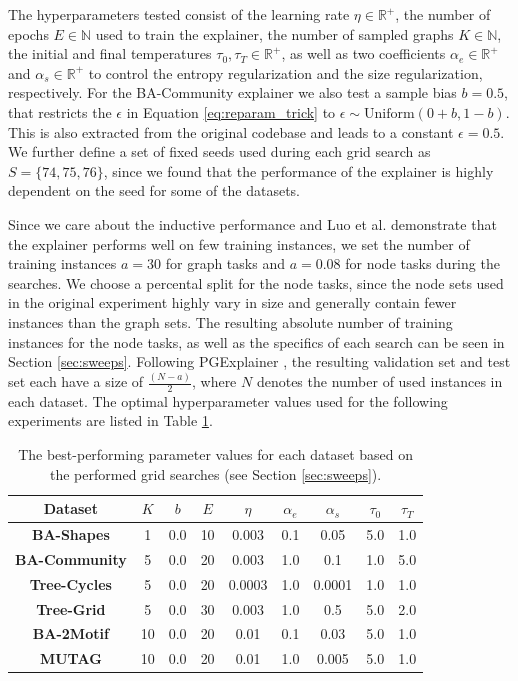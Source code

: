 The hyperparameters tested consist of the learning rate $\eta \in \mathbb{R}^+$, the number of epochs $E \in \mathbb{N}$ used to train the explainer, the number of sampled graphs $K \in \mathbb{N}$, the initial and final temperatures $\tau_0, \tau_T \in \mathbb{R}^+$, as well as two coefficients $\alpha_e\in \mathbb{R}^+$ and $\alpha_s\in \mathbb{R}^+$ to control the entropy regularization and the size regularization, respectively. For the BA-Community explainer we also test a sample bias $b=0.5$, that restricts the $\epsilon$ in Equation \ref{eq:reparam_trick} to $\epsilon \sim \text{Uniform}(0+b,1-b)$. This is also extracted from the original codebase and leads to a constant $\epsilon=0.5$. We further define a set of fixed seeds used during each grid search as $S=\{74,75,76\}$, since we found that the performance of the explainer is highly dependent on the seed for some of the datasets. \bigskip

Since we care about the inductive performance and Luo et al. \cite{luo2020parameterized} demonstrate that the explainer performs well on few training instances, we set the number of training instances $a=30$ for graph tasks and $a=0.08$ for node tasks during the searches. We choose a percental split for the node tasks, since the node sets used in the original experiment highly vary in size and generally contain fewer instances than the graph sets. The resulting absolute number of training instances for the node tasks, as well as the specifics of each search can be seen in Section \ref{sec:sweeps}. Following PGExplainer \cite{luo2020parameterized}, the resulting validation set and test set each have a size of $\frac{(N-a)}{2}$, where $N$ denotes the number of used instances in each dataset. The optimal hyperparameter values used for the following experiments are listed in Table \ref{tab:best_sweep_values}. \bigskip

\begin{table}[h]
    \centering
    \scriptsize
    \begin{tabular}{|c|c|c|c|c|c|c|c|c|} \hline
    Dataset & $K$ & $b$ & $E$ & $\eta$ & $\alpha_e$ & $\alpha_s$ & $\tau_0$ & $\tau_T$ \\ \hline
    \textbf{BA-Shapes} & 1 & 0.0 & 10 & 0.003 & 0.1 & 0.05 & 5.0 & 1.0 \\ \hline
    \textbf{BA-Community} & 5 & 0.0 & 20 & 0.003 & 1.0 & 0.1 & 1.0 & 5.0 \\ \hline
    \textbf{Tree-Cycles} & 5 & 0.0 & 20 & 0.0003 & 1.0 & 0.0001 & 1.0 & 1.0 \\ \hline
    \textbf{Tree-Grid} & 5 & 0.0 & 30 & 0.003 & 1.0 & 0.5 & 5.0 & 2.0 \\ \hline
    \textbf{BA-2Motif} & 10 & 0.0 & 20 & 0.01 & 0.1 & 0.03 & 5.0 & 1.0 \\ \hline
    \textbf{MUTAG} & 10 & 0.0 & 20 & 0.01 & 1.0 & 0.005 & 5.0 & 1.0 \\ \hline
    \end{tabular}
    \caption[Optimal explainer parameter values for each dataset]{The best-performing parameter values for each dataset based on the performed grid searches (see Section \ref{sec:sweeps}).}
    \label{tab:best_sweep_values}
  \end{table}

